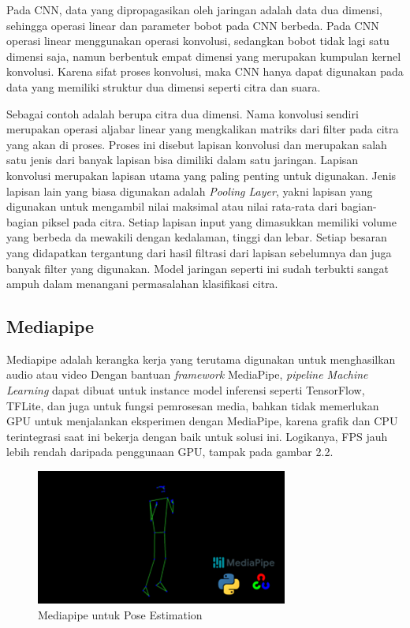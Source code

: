 Pada CNN, data yang dipropagasikan oleh jaringan adalah data dua dimensi, sehingga operasi linear dan parameter bobot pada CNN berbeda. Pada CNN operasi linear menggunakan operasi konvolusi, sedangkan bobot tidak lagi satu dimensi saja, namun berbentuk empat dimensi yang merupakan kumpulan kernel konvolusi. Karena sifat proses konvolusi, maka CNN hanya dapat digunakan pada data yang memiliki struktur dua dimensi seperti citra dan suara.

Sebagai contoh adalah berupa citra dua dimensi. Nama konvolusi sendiri merupakan operasi aljabar linear yang mengkalikan matriks dari filter pada citra yang akan di proses. Proses ini disebut lapisan konvolusi dan merupakan salah satu jenis dari banyak lapisan bisa dimiliki dalam satu jaringan. Lapisan konvolusi merupakan lapisan utama yang paling penting untuk digunakan. Jenis lapisan lain yang biasa digunakan adalah \emph{Pooling Layer}, yakni lapisan yang digunakan untuk mengambil nilai maksimal atau nilai rata-rata dari bagian-bagian piksel pada citra. Setiap lapisan input yang dimasukkan memiliki volume yang berbeda da mewakili dengan kedalaman, tinggi dan lebar. Setiap besaran yang didapatkan tergantung dari hasil filtrasi dari lapisan sebelumnya dan juga banyak filter yang digunakan. Model jaringan seperti ini sudah terbukti sangat ampuh dalam menangani permasalahan klasifikasi citra. 


\subsection{Mediapipe}

Mediapipe adalah kerangka kerja yang terutama digunakan untuk menghasilkan audio atau video Dengan bantuan \emph{framework} MediaPipe, \emph{pipeline Machine Learning} dapat dibuat untuk instance model inferensi seperti TensorFlow, TFLite, dan juga untuk fungsi pemrosesan media, bahkan tidak memerlukan GPU untuk menjalankan eksperimen dengan MediaPipe, karena grafik dan CPU terintegrasi saat ini bekerja dengan baik untuk solusi ini. Logikanya, FPS jauh lebih rendah daripada penggunaan GPU, tampak pada gambar 2.2.

\begin{figure} [ht] \centering
  \includegraphics[scale=1]{gambar/mediapipe.png}
  \caption{Mediapipe untuk Pose Estimation}
  \label{fig:Mediapipe}
\end{figure}


